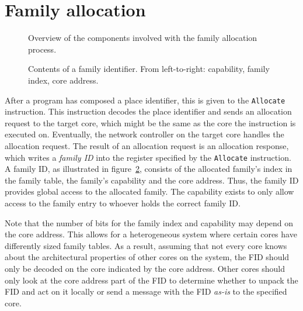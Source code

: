 \section{\label{sec:family-allocation}Family allocation}

\begin{figure}
 \begin{center}
  
  \caption{Overview of the components involved with the family allocation process.}
  \label{fig:family-allocation}
 \end{center}
\end{figure}

\begin{figure}
 \begin{center}
  
  \caption{Contents of a family identifier. From left-to-right: capability, family index, core address.}
  \label{fig:fid-contents}
 \end{center}
\end{figure}

After a program has composed a place identifier, this is given to the {\tt Allocate} instruction. This instruction decodes the place identifier and sends an allocation request to the target core, which might be the same as the core the instruction is executed on. Eventually, the network controller on the target core handles the allocation request. The result of an allocation request is an allocation response, which writes a \emph{family ID} into the register specified by the {\tt Allocate} instruction. A family ID, as illustrated in figure~\ref{fig:fid-contents}, consists of the allocated family's index in the family table, the family's capability and the core address. Thus, the family ID provides global access to the allocated family. The capability exists to only allow access to the family entry to whoever holds the correct family ID.

Note that the number of bits for the family index and capability may depend on the core address. This allows for a heterogeneous system where certain cores have differently sized family tables. As a result, assuming that not every core knows about the architectural properties of other cores on the system, the FID should only be decoded on the core indicated by the core address. Other cores should only look at the core address part of the FID to determine whether to unpack the FID and act on it locally or send a message with the FID \emph{as-is} to the specified core.

